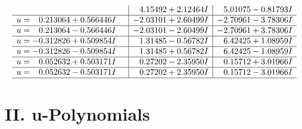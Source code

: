 \documentclass[1p]{elsarticle_modified}
\theoremstyle{definition}
\begin{document}
$$\begin{array}{c|c|c}
 & \phantom{-}4.15492 + 2.12464 I & \phantom{-}5.01075 - 0.81793 I \\ \hline\begin{aligned}
u &= \phantom{-}0.213064 + 0.566446 I\end{aligned}
 & -2.03101 + 2.60499 I & -2.70961 - 3.78306 I \\ \hline\begin{aligned}
u &= \phantom{-}0.213064 - 0.566446 I\end{aligned}
 & -2.03101 - 2.60499 I & -2.70961 + 3.78306 I \\ \hline\begin{aligned}
u &= -0.312826 + 0.509854 I\end{aligned}
 & \phantom{-}1.31485 - 0.56782 I & \phantom{-}6.42425 + 1.08959 I \\ \hline\begin{aligned}
u &= -0.312826 - 0.509854 I\end{aligned}
 & \phantom{-}1.31485 + 0.56782 I & \phantom{-}6.42425 - 1.08959 I \\ \hline\begin{aligned}
u &= \phantom{-}0.052632 + 0.503171 I\end{aligned}
 & \phantom{-}0.27202 - 2.35950 I & \phantom{-}0.15712 + 3.01966 I \\ \hline\begin{aligned}
u &= \phantom{-}0.052632 - 0.503171 I\end{aligned}
 & \phantom{-}0.27202 + 2.35950 I & \phantom{-}0.15712 - 3.01966 I\\
 \hline 
 \end{array}$$\newpage
\newpage\renewcommand{\arraystretch}{1}
\centering \section*{ II. u-Polynomials}
\end{document}
